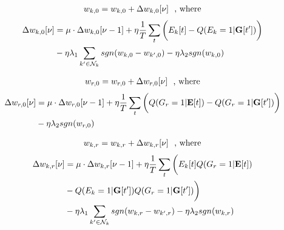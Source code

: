 \begin{align*}
w_{k, 0} = w_{k, 0} + \Delta w_{k, 0}[\nu] \textrm{\,\,\,\,, where}
\end{align*}
\begin{align*}
\Delta w_{k, 0}[\nu] &= \mu \cdot \Delta w_{k, 0}[\nu-1]  + \eta \frac{1}{T}\sum\limits_t  \bigg( E_k[t] - Q( E_k = 1 | \mathbf{G}[t'] ) \bigg) \\
& - \eta \lambda_1 \sum\limits_{k' \in \mathcal{N}_k} sgn( w_{k, 0} - w_{k', 0} ) - \eta \lambda_2 sgn( w_{k, 0} )  \\
\end{align*}

\begin{align*}
w_{r, 0} = w_{r, 0} + \Delta w_{r, 0}[\nu]   \textrm{\,\,\,\,, where}
\end{align*}
\begin{align*}
\Delta w_{r, 0}[\nu] &= \mu \cdot \Delta w_{r, 0}[\nu-1] + \eta \frac{1}{T}\sum\limits_t  \bigg( Q( G_r = 1 | \mathbf{E}[t] ) - Q( G_r =1 | \mathbf{G}[t'] ) \bigg) \\
&  - \eta \lambda_2 sgn( w_{r, 0} ) 
\end{align*}


\begin{align*}
w_{k, r} = w_{k, r} + \Delta w_{k, r}[\nu] \textrm{\,\,\,\,, where}
\end{align*}
\begin{align*}
\Delta w_{k, r}[\nu] &= \mu \cdot \Delta w_{k, r}[\nu-1] + \eta \frac{1}{T}\sum\limits_t  \bigg( E_k[t] Q( G_r = 1 | \mathbf{E}[t] ) \\ 
& - Q( E_k = 1 | \mathbf{G}[t'] )Q( G_r =1 | \mathbf{G}[t'] ) \bigg) \\
&  - \eta \lambda_1 \sum\limits_{k' \in \mathcal{N}_k} sgn( w_{k, r} - w_{k', r} ) - \eta \lambda_2 sgn(w_{k, r})  \\
\end{align*}

